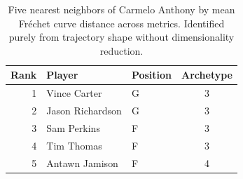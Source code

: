 \begin{table}[htbp]
  \centering\small
  \begin{tabular}{rllc}
    \toprule
    Rank & Player & Position & Archetype \\
    \midrule
    1 & Vince Carter & G & 3 \\
    2 & Jason Richardson & G & 3 \\
    3 & Sam Perkins & F & 3 \\
    4 & Tim Thomas & F & 3 \\
    5 & Antawn Jamison & F & 4 \\
    \bottomrule
  \end{tabular}
  \caption{Five nearest neighbors of Carmelo Anthony by mean Fr\'{e}chet curve distance across metrics. Identified purely from trajectory shape without dimensionality reduction.}
  \label{tab:Carmelo_Anthony_frechet_curve_neighbors}
\end{table}

